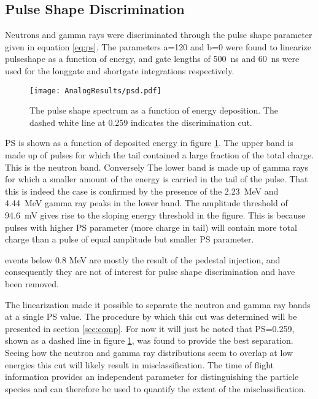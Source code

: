 \documentclass[main.tex]{subfiles}
\begin{document}
\subsection{Pulse Shape Discrimination}
Neutrons and gamma rays were discriminated through the pulse shape parameter given in equation \ref{eq:ps}. The parameters a=120 and b=0 were found to linearize pulseshape as a function of energy, and gate lengths of \SI{500}{\ns} and \SI{60}{ns} were used for the longgate and shortgate integrations respectively.

\begin{figure}[ht]
    \centering
        \texttt{[image: AnalogResults/psd.pdf]}
        \caption[PSD spectrum, analog setup.]{The pulse shape spectrum as a function of energy deposition. The dashed white line at 0.259 indicates the discrimination cut.}
        \label{fig:psd_a}
\end{figure}

PS is shown as a function of deposited energy in figure \ref{fig:psd_a}. The upper band is made up of pulses for which the tail contained a large fraction of the total charge. This is the neutron band. Conversely The lower band is made up of gamma rays for which a smaller amount of the energy is carried in the tail of the pulse. That this is indeed the case is confirmed by the presence of the \SI{2.23}{MeV} and \SI{4.44}{MeV} gamma ray peaks in the lower band. The amplitude threshold of \SI{94.6}{mV} gives rise to the sloping energy threshold in the figure. This is because pulses with higher PS parameter (more charge in tail) will contain more total charge than a pulse of equal amplitude but smaller PS parameter.


events below 0.8 MeV are mostly the result of the pedestal injection, and consequently they are not of interest for pulse shape discrimination and have been removed.

The linearization made it possible to separate the neutron and gamma ray bands at a single PS value. The procedure by which this cut was determined will be presented in section \ref{sec:comp}. For now it will just be noted that PS=0.259, shown as a dashed line in figure \ref{fig:psd_a}, was found to provide the best separation. Seeing how the neutron and gamma ray distributions seem to overlap at low energies this cut will likely result in misclassification. The time of flight information provides an independent parameter for distinguishing the particle species and can therefore be used to quantify the extent of the misclassification.
\end{document}
